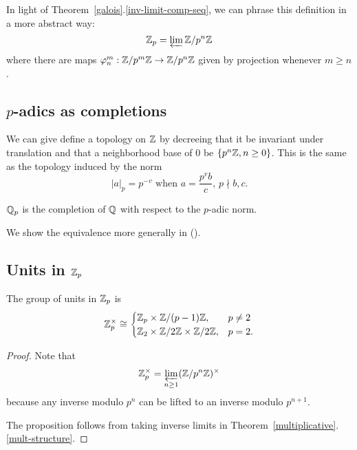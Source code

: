 In light of Theorem~\ref{galois}.\ref{inv-limit-comp-seq}, we can phrase this definition in a more abstract way:
\[
\mathbb{Z}_p=\varprojlim \mathbb{Z}/p^n\mathbb{Z}
\]
where there are maps $\varphi^m_n: \mathbb{Z}/p^{m}\mathbb{Z}\to \mathbb{Z}/p^n\mathbb{Z}$ given by projection whenever $m\ge n$. %
\subsection{$p$-adics as completions}
We can give define a topology on $\mathbb{Z}$ by decreeing that it be invariant under translation and that a neighborhood base of $0$ be $\{p^n\mathbb{Z},n\ge 0\}$. This is the same as the topology induced by the norm
\[
|a|_p=p^{-v}\text{ when }a=\frac{p^vb}{c},\,p\nmid b,c.
\]
\begin{df}
$\mathbb{Q}_p$ is the completion of $\mathbb{Q}$ with respect to the $p$-adic norm.
\end{df}
We show the equivalence more generally in ().
\subsection{Units in $\mathbb{Z}_p$}
\begin{pr}
The group of units in $\mathbb{Z}_p$ is
\[
\mathbb{Z}_p^{\times}\cong
\begin{cases}
\mathbb{Z}_p\times \mathbb{Z}/(p-1)\mathbb{Z},&p\ne 2\\
\mathbb{Z}_2\times \mathbb{Z}/2\mathbb{Z}\times \mathbb{Z}/2\mathbb{Z},&p=2.\end{cases}
\]
\end{pr}
\begin{proof}
Note that
\[
\mathbb{Z}_p^{\times}=\varprojlim_{n\ge 1} (\mathbb{Z}/p^n\mathbb{Z})^{\times}
\]
because any inverse modulo $p^n$ can be lifted to an inverse modulo $p^{n+1}$.

The proposition follows from taking inverse limits in Theorem~\ref{multiplicative}.\ref{mult-structure}.
\end{proof}
